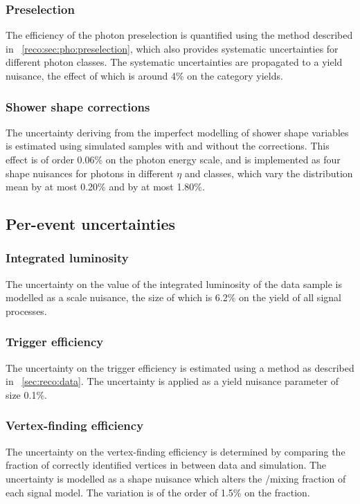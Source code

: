 \subsubsection{Preselection}
The efficiency of the photon preselection is quantified using the \TagAndProbe method described in \Sec~\ref{reco:sec:pho:preselection}, which also provides systematic uncertainties for different photon classes. The systematic uncertainties are propagated to a yield nuisance,
the effect of which is around 4\% on the category yields.

\subsubsection{Shower shape corrections}
The uncertainty deriving from the imperfect modelling of shower shape variables is estimated using simulated samples with and without the corrections. This effect is of order 0.06\% on the photon energy scale, and is implemented as four shape nuisances for photons in different $\eta$ and \RNINE classes, which vary the \mgg distribution mean by at most 0.20\% and \effSigma by at most 1.80\%.

\subsection{Per-event uncertainties}

\subsubsection{Integrated luminosity}
The uncertainty on the value of the integrated luminosity of the data sample is modelled as a scale nuisance, the size of which is 6.2\% on the yield of all signal processes. 

\subsubsection{Trigger efficiency}
The uncertainty on the trigger efficiency is estimated using a \TagAndProbe method as described in \Sec~\ref{sec:reco:data}. The uncertainty is applied as a yield nuisance parameter of size 0.1\%.

\subsubsection{Vertex-finding efficiency}
The uncertainty on the vertex-finding efficiency is determined by comparing the fraction of correctly identified vertices in \Zmumu between data and simulation. The uncertainty is modelled as a shape nuisance which alters the \RV/\WV mixing fraction of each signal model. The variation is of the order of 1.5\% on the \RV fraction.

